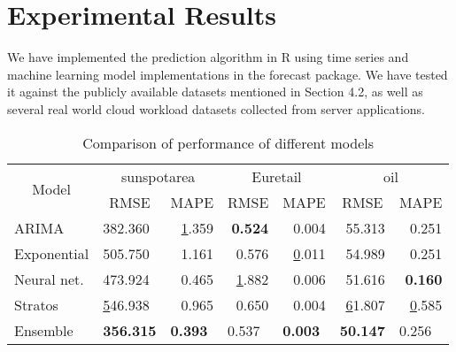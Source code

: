 
\section{Experimental Results}

We have implemented the prediction algorithm in R using time series and machine learning model implementations in the forecast package. We have tested it against the publicly available datasets mentioned in Section 4.2, as well as several real world cloud workload datasets \cite{AutoscaleAnalyser} collected from server applications.

\begin{table}[]
\centering
\caption{Comparison of performance of different models}
\label{my-label}
\begin{tabular}{|l|l|r|r|r|r|r|}
\hline
\multicolumn{1}{|c|}{\multirow{2}{*}{Model}} & \multicolumn{2}{c|}{sunspotarea}                                  & \multicolumn{2}{c|}{Euretail}                                        & \multicolumn{2}{c|}{oil}                                              \\ \cline{2-7} 
\multicolumn{1}{|c|}{}                       & \multicolumn{1}{c|}{RMSE} & \multicolumn{1}{c|}{MAPE}             & \multicolumn{1}{c|}{RMSE}    & \multicolumn{1}{c|}{MAPE}             & \multicolumn{1}{c|}{RMSE}              & \multicolumn{1}{c|}{MAPE}    \\ \hline
ARIMA                                        & 382.360                 & {\ul 1.359}                         & \textbf{0.524}             & 0.004                               & 55.313                               & 0.251                      \\ \hline
Exponential                                  & 505.750                 & 1.161                               & 0.576                      & {\ul 0.011}                         & 54.989                               & 0.251                      \\ \hline
Neural net.                                  & 473.924                 & 0.465                               & {\ul 1.882}                & 0.006                               & 51.616                               & \textbf{0.160}             \\ \hline
Stratos                                      & {\ul 546.938}           & 0.965                               & 0.650                      & 0.004                               & {\ul 61.807}                         & {\ul 0.585}                \\ \hline
Ensemble                                     & \textbf{356.315}        & \multicolumn{1}{l|}{\textbf{0.393}} & \multicolumn{1}{l|}{0.537} & \multicolumn{1}{l|}{\textbf{0.003}} & \multicolumn{1}{l|}{\textbf{50.147}} & \multicolumn{1}{l|}{0.256} \\ \hline
\end{tabular}
\end{table}


